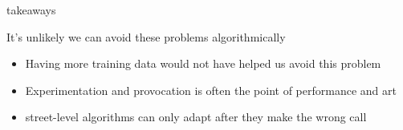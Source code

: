 \documentclass[presentation]{subfiles}
\begin{document}
\begin{frame}

\end{frame}


\begin{frame}{takeaways}
  
  It's unlikely we can avoid these problems algorithmically

\begin{itemize}
  \item Having \alert{more training data} would not have helped us avoid this problem
  \item Experimentation and provocation is often the \alert{point} of performance and art
  \item street-level algorithms can only adapt \alert{after} they make the wrong call
\end{itemize}

\end{frame}



  

  
  
  




\end{document}

